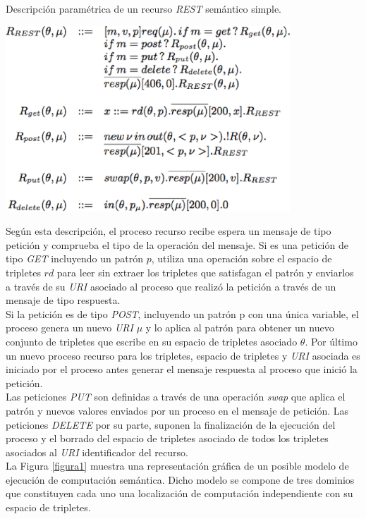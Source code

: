 \begin{table}
\vspace{2.4in}
\caption{Descripci\'on param\'etrica de un recurso \textit{REST} sem\'antico simple.}
\includegraphics[width=0.8\textwidth]{tabla4}
\label{tabla4}
\end{table}


Seg\'un esta descripci\'on, el proceso recurso recibe espera un mensaje de tipo petici\'on y comprueba el tipo de la operaci\'on del mensaje.
Si es una petici\'on de tipo \textit{GET} incluyendo un patr\'on $p$, utiliza una operaci\'on sobre el espacio de tripletes $rd$ para leer sin extraer los tripletes que satisfagan el patr\'on y enviarlos a trav\'es de su \textit{URI} asociado al proceso que realiz\'o la petici\'on a trav\'es de un mensaje de tipo respuesta.\\
Si la petici\'on es de tipo \textit{POST}, incluyendo un patr\'on p con una \'unica variable, el proceso genera un nuevo \textit{URI} $\mu$ y lo aplica al patr\'on para obtener un nuevo conjunto de tripletes que escribe en su espacio de tripletes asociado $\theta$. Por \'ultimo un nuevo proceso recurso para los tripletes, espacio de tripletes y \textit{URI} asociada es iniciado por el proceso antes generar el mensaje respuesta al proceso que inici\'o la petici\'on.\\
Las peticiones \textit{PUT} son definidas a trav\'es de una operaci\'on \textit{swap} que aplica el patr\'on y nuevos valores enviados por un proceso en el mensaje de petici\'on. Las peticiones \textit{DELETE} por su parte, suponen la finalizaci\'on de la ejecuci\'on del proceso y el borrado del espacio de tripletes asociado de todos los tripletes asociados al \textit{URI} identificador del recurso.\\
La Figura \ref{figura1} muestra una representaci\'on gr\'afica de un posible modelo de ejecuci\'on de computaci\'on sem\'antica. Dicho modelo se compone de tres dominios que constituyen cada uno una localizaci\'on de computaci\'on independiente con su espacio de tripletes.\\

